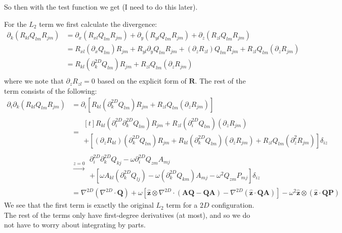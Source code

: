\documentclass[reqno]{article}
\newcommand{\Q}{\mathbf{Q}}
\newcommand{\R}{\mathbf{R}}
\newcommand{\bP}{\mathbf{P}}
\newcommand{\A}{\mathbf{A}}
\newcommand{\z}{\mathbf{\hat{z}}}
\begin{document}
So then with the test function we get (I need to do this later).

For the $L_2$ term we first calculate the divergence:
\begin{equation}
\begin{split}
    \partial_k (R_{kl} Q_{lm} R_{jm})
    &=
    \partial_x (R_{xl} Q_{lm} R_{jm})
    + \partial_y (R_{yl} Q_{lm} R_{jm})
    + \partial_z (R_{zl} Q_{lm} R_{jm}) \\
    &=
    R_{xl} (\partial_x Q_{lm}) R_{jm}
    + R_{yl} \partial_y Q_{lm} R_{jm}
    + (\partial_z R_{zl}) Q_{lm} R_{jm}
    + R_{zl} Q_{lm} (\partial_z R_{jm}) \\
    &=
    R_{kl} (\partial^{2D}_k Q_{lm}) R_{jm}
    + R_{zl} Q_{lm} (\partial_z R_{jm}) \\
\end{split}
\end{equation}
where we note that $\partial_z R_{zl} = 0$ based on the explicit form of $\R$.
The rest of the term consists of the following:
\begin{equation}
\begin{split}
    \partial_i \partial_k (R_{kl} Q_{lm} R_{jm})
    &=
    \partial_i \left[
        R_{kl} (\partial^{2D}_k Q_{lm}) R_{jm}
        + R_{zl} Q_{lm} (\partial_z R_{jm})
    \right] \\
    &=
    \begin{multlined}[t]
        R_{kl} (\partial_i^{2D} \partial^{2D}_k Q_{lm}) R_{jm}
        + R_{zl} (\partial_i^{2D} Q_{lm}) (\partial_z R_{jm}) \\
        +
        \left[
            (\partial_z R_{kl}) (\partial^{2D}_k Q_{lm}) R_{jm}
            + R_{kl} (\partial^{2D}_k Q_{lm}) (\partial_z R_{jm} )
            + R_{zl} Q_{lm} (\partial^2_z R_{jm})
        \right] \delta_{iz}
    \end{multlined} \\
    &\stackrel{z = 0}{\to} 
    \begin{multlined}
        \partial_i^{2D} \partial_k^{2D} Q_{kj}
        - \omega \partial_i^{2D} Q_{zm} A_{mj} \\
        + \left[
            \omega A_{kl} (\partial_k^{2D} Q_{lj} ) 
            - \omega (\partial_k^{2D} Q_{km}) A_{mj}
            - \omega^2 Q_{zm} P_{mj}
        \right] \delta_{iz}
    \end{multlined} \\
    &=
    \nabla^{2D} \left( \nabla^{2D} \cdot \Q \right)
    + \omega \left[
        \z \otimes \nabla^{2D} \cdot \left(
            \A \Q - \Q \A
        \right)
        - \nabla^{2D} \left( \mathbf{\hat{z}} \cdot \Q \A \right)
    \right]
    - \omega^2 \mathbf{\hat{z}} \otimes \left( \mathbf{\hat{z}} \cdot \Q \bP \right)
\end{split}
\end{equation}
We see that the first term is exactly the original $L_2$ term for a $2D$ configuration.
The rest of the terms only have first-degree derivatives (at most), and so we do not have to worry about integrating by parts.
\end{document}
